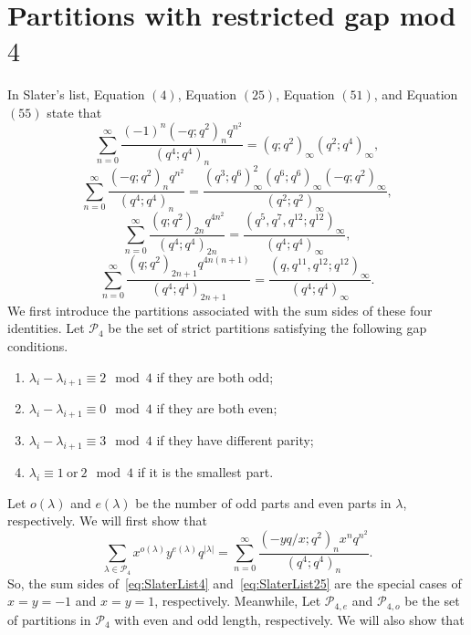 \documentclass[12pt]{amsart}
\theoremstyle{definition}
\theoremstyle{remark}
\numberwithin{equation}{section}
\begin{document}
\section{Partitions with restricted gap mod $4$}\label{sec:SlaterList4}
In Slater's list, Equation $(4)$, Equation $(25)$, Equation $(51)$, and Equation $(55)$ state that
\begin{equation}\label{eq:SlaterList4}
\sum_{n=0}^{\infty}\frac{(-1)^{n}(-q;q^2)_{n}q^{n^2}}{(q^4;q^4)_{n}}=(q;q^2)_{\infty}(q^2;q^4)_{\infty},    
\end{equation}
\begin{equation}\label{eq:SlaterList25}
\sum_{n=0}^{\infty}\frac{(-q;q^2)_{n}q^{n^2}}{(q^4;q^4)_{n}}=\dfrac{(q^3;q^6)^2_\infty(q^6;q^6)_\infty(-q;q^2)_\infty}{(q^2;q^2)_\infty}, 
\end{equation}
\begin{equation}\label{eq:SlaterList53}
\sum_{n=0}^{\infty}\frac{(q;q^2)_{2n}q^{4n^2}}{(q^4;q^4)_{2n}}=\dfrac{(q^5,q^7,q^{12};q^{12})_\infty}{(q^4;q^4)_\infty},
\end{equation}
\begin{equation}\label{eq:SlaterList55}
\sum_{n=0}^{\infty}\frac{(q;q^2)_{2n+1}q^{4n(n+1)}}{(q^4;q^4)_{2n+1}}=\dfrac{(q,q^{11},q^{12};q^{12})_\infty}{(q^4;q^4)_\infty}.  
\end{equation}
We first introduce the partitions associated with the sum sides of these four identities. Let $\mathcal{P}_4$ be the set of strict partitions satisfying the following gap conditions.
\begin{enumerate}
    \item $\lambda_i-\lambda_{i+1}\equiv2\mod4$ if they are both odd;
    \item $\lambda_i-\lambda_{i+1}\equiv0\mod4$ if they are both even;
    \item $\lambda_{i}-\lambda_{i+1}\equiv3\mod4$ if they have different parity;
    \item $\lambda_{i}\equiv1\ \text{or}\ 2\mod4$ if it is the smallest part.
\end{enumerate}
Let $o(\lambda)$ and $e(\lambda)$ be the number of odd parts and even parts in $\lambda$, respectively. We will first show that
\begin{equation}
\sum_{\lambda\in\mathcal{P}_4}x^{o(\lambda)}y^{e(\lambda)}q^{|\lambda|}=\sum_{n=0}^{\infty}\frac{(-yq/x;q^2)_{n}x^{n}q^{n^2}}{(q^4;q^4)_{n}}.
\end{equation}
So, the sum sides of~\eqref{eq:SlaterList4} and~\eqref{eq:SlaterList25} are the special cases of $x=y=-1$ and $x=y=1$, respectively. Meanwhile, Let $\mathcal{P}_{4,e}$ and $\mathcal{P}_{4,o}$ be the set of partitions in $\mathcal{P}_{4}$ with even and odd length, respectively. We will also show that
\end{document}

